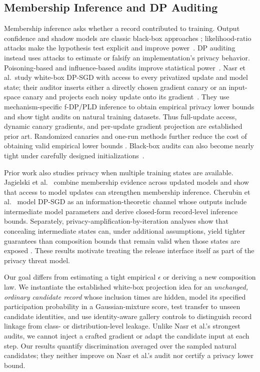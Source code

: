 \documentclass[conference]{IEEEtran}
\begin{document}
\subsection{Membership Inference and DP Auditing}

Membership inference asks whether a record contributed to training. Output confidence and shadow models are classic black-box approaches \cite{shokri2017membership}; likelihood-ratio attacks make the hypothesis test explicit and improve power~\cite{carlini2022membership,zarifzadeh2024lowcost}. DP auditing instead uses attacks to estimate or falsify an implementation's privacy behavior. Poisoning-based and influence-based audits improve statistical power~\cite{jagielski2020auditing,lu2022general}. Nasr et al.\ study white-box DP-SGD with access to every privatized update and model state; their auditor inserts either a directly chosen gradient canary or an input-space canary and projects each noisy update onto its gradient~\cite{nasr2023tight}. They use mechanism-specific f-DP/PLD inference to obtain empirical privacy lower bounds and show tight audits on natural training datasets. Thus full-update access, dynamic canary gradients, and per-update gradient projection are established prior art. Randomized canaries and one-run methods further reduce the cost of obtaining valid empirical lower bounds \cite{pillutla2023randomization,steinke2023one}. Black-box audits can also become nearly tight under carefully designed initializations~\cite{annamalai2024blackbox}.

Prior work also studies privacy when multiple training states are available. Jagielski et al.~\cite{jagielski2023updates} combine membership evidence across updated models and show that access to model updates can strengthen membership inference. Cherubin et al.~\cite{cherubin2024closed} model DP-SGD as an information-theoretic channel whose outputs include intermediate model parameters and derive closed-form record-level inference bounds. Separately, privacy-amplification-by-iteration analyses show that concealing intermediate states can, under additional assumptions, yield tighter guarantees than composition bounds that remain valid when those states are exposed \cite{feldman2018iteration,ye2022hidden}. These results motivate treating the release interface itself as part of the privacy threat model.

Our goal differs from estimating a tight empirical $\epsilon$ or deriving a new composition law. We instantiate the established white-box projection idea for an \emph{unchanged, ordinary candidate record} whose inclusion times are hidden, model its specified participation probability in a Gaussian-mixture score, test transfer to unseen candidate identities, and use identity-aware gallery controls to distinguish record linkage from class- or distribution-level leakage. Unlike Nasr et al.'s strongest audits, we cannot inject a crafted gradient or adapt the candidate input at each step. Our results quantify discrimination averaged over the sampled natural candidates; they neither improve on Nasr et al.'s audit nor certify a privacy lower bound.
\end{document}

